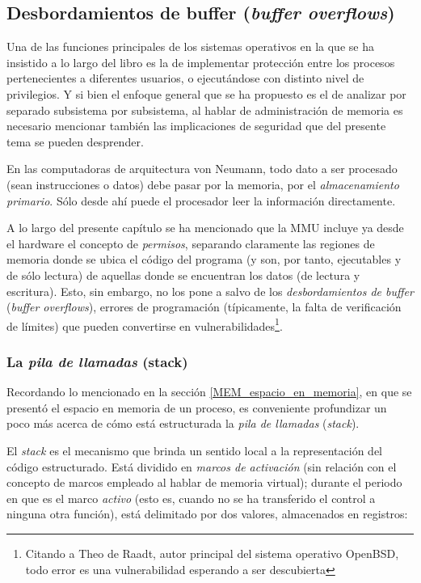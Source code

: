 \documentclass[11pt,fleqn]{book} %
\begin{document}
\subsection{Desbordamientos de buffer (\emph{buffer overflows})}
\label{sec-5-6-1}
\label{MEM_buffer_overflow}


Una de las funciones principales de los sistemas operativos en la
que se ha insistido a lo largo del libro es la de implementar protección entre
los procesos pertenecientes a diferentes usuarios, o ejecutándose con
distinto nivel de privilegios. Y si bien el enfoque general que
se ha propuesto es el de analizar por separado subsistema por
subsistema, al hablar de administración de memoria es necesario
mencionar también las implicaciones de seguridad que del presente
tema se pueden desprender.

En las computadoras de arquitectura von Neumann, todo dato a ser
procesado (sean instrucciones o datos) debe pasar por la memoria, por
el \emph{almacenamiento primario}. Sólo desde ahí puede el procesador
leer la información directamente.

A lo largo del presente capítulo se ha mencionado que la MMU incluye ya
desde el hardware el concepto de \emph{permisos}, separando claramente las
regiones de memoria donde se ubica el código del programa (y son, por
tanto, ejecutables y de sólo lectura) de aquellas donde se encuentran
los datos (de lectura y escritura). Esto, sin embargo, no los pone a
salvo de los \emph{desbordamientos de buffer} (\emph{buffer overflows}),
errores de programación (típicamente, la falta de verificación de
límites) que pueden convertirse en vulnerabilidades\footnote{Citando a
Theo de Raadt, autor principal del sistema operativo OpenBSD, todo
error es una vulnerabilidad esperando a ser descubierta }.
\subsubsection{La \emph{pila de llamadas} (stack)}
\label{sec-5-6-1-1}


Recordando lo mencionado en la sección \ref{MEM_espacio_en_memoria},
en que se presentó el espacio en memoria de un proceso, es conveniente
profundizar un poco más acerca de cómo está estructurada la 
\emph{pila de llamadas} (\emph{stack}).

El \emph{stack} es el mecanismo que brinda un sentido local a la
representación del código estructurado. Está dividido en \emph{marcos de activación} (sin
relación con el concepto de marcos empleado al hablar de memoria
virtual); durante el periodo en que es el marco \emph{activo} (esto es,
cuando no se ha transferido el control a ninguna otra función), está
delimitado por dos valores, almacenados en registros:
\end{document}

